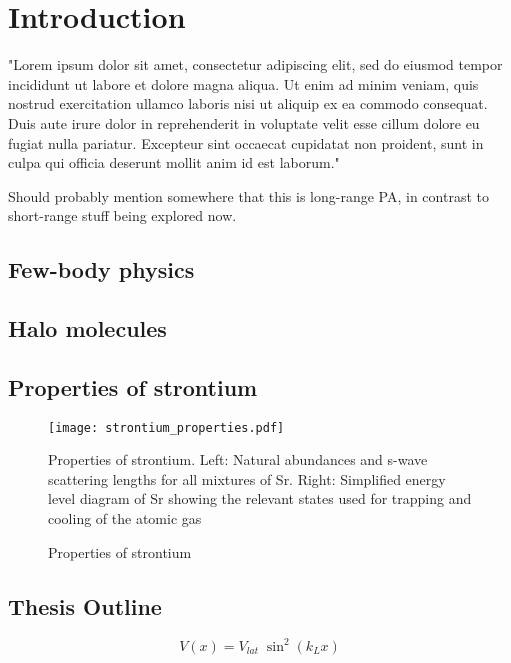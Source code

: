\chapter{Introduction}
\label{ch:intro}

"Lorem ipsum dolor sit amet, consectetur adipiscing elit, sed do eiusmod tempor incididunt ut labore et dolore magna aliqua. Ut enim ad minim veniam, quis nostrud exercitation ullamco laboris nisi ut aliquip ex ea commodo consequat. Duis aute irure dolor in reprehenderit in voluptate velit esse cillum dolore eu fugiat nulla pariatur. Excepteur sint occaecat cupidatat non proident, sunt in culpa qui officia deserunt mollit anim id est laborum."

Should probably mention somewhere that this is long-range PA, in contrast to short-range stuff being explored now.

\cite{Aman2018}

\section{Few-body physics}
\label{sec:few-body}

\section{Halo molecules}
\label{sec:halo}

\section{Properties of strontium}
\label{sec:sr}

\begin{figure}
\label{fig:energy_level_diagram}
	\centerline{
	\texttt{[image: strontium\_properties.pdf]}}
	\caption{Properties of strontium}{Properties of strontium. Left: Natural abundances and s-wave scattering lengths for all mixtures of Sr. Right: Simplified energy level diagram of Sr showing the relevant states used for trapping and cooling of the atomic gas}
\end{figure} 

\section{Thesis Outline}
\label{sec:outline}


\begin{equation} 
\label{eq:1dlattice}
		 V(x) = V_{lat} \; \sin^2(k_L x)
\end{equation}



